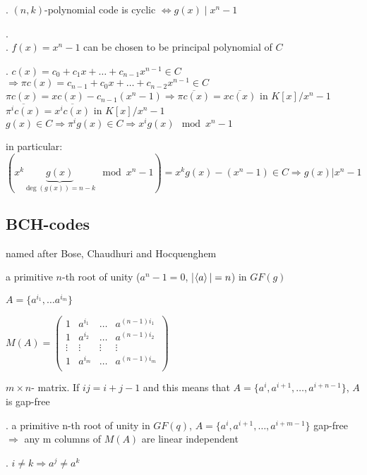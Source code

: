 \Theorem.
$(n,k)$-polynomial code is cyclic $\Leftrightarrow g(x) \mid x^n-1$

\Proof.\\
\ProofBackward.
$f(x) = x^n-1$ can be chosen to be principal polynomial of $C$

\ProofForward.
$c(x) = c_0 + c_1x + \ldots + c_{n-1}x^{n-1} \in C$\\
$\Rightarrow \pi c(x) = c_{n-1} + c_0x + \ldots + c_{n-2}x^{n-1} \in C$\\
$\pi c(x) = xc(x) - c_{n-1}(x^n-1) \Rightarrow \overline{\pi c(x)} = \overline{x c(x)}$ in $K[x]/x^n-1$\\
$\overline{\pi^i c(x)} = \overline{x^i c(x)}$ in $K[x]/x^n-1$\\

$g(x) \in C \Rightarrow \pi^i g(x) \in C \Rightarrow x^i g(x) \mod x^n -1$

in particular: $( x^k \underbrace{g(x)}_{\deg(g(x)) = n-k} \mod x^n -1 ) = x^k g(x) - (x^n-1) \in C \Rightarrow g(x)|x^n-1$

\subsection{BCH-codes }
named after Bose, Chaudhuri and Hocquenghem

a primitive $n$-th root of unity ($a^n-1=0$, |$\left\langle a \right\rangle|=n$) in $GF(g)$

$A = \{a^{i_1}, \ldots a^{i_m}\}$

$M(A) = \begin{pmatrix}
  1 & a^{i_1} & \ldots & a^{(n-1)i_1} \\
  1 & a^{i_2} & \ldots & a^{(n-1)i_2} \\
  \vdots  & \vdots & \vdots & \vdots \\
  1 & a^{i_m} & \ldots & a^{(n-1)i_m} \\
\end{pmatrix}$

$m\times n$- matrix. If $ij = i+j-1$ and this means that $A = \{a^i, a^{i+1}, \ldots, a^{i+n-1} \}$, $A$ is gap-free

\Theorem.
a primitive n-th root of unity in $GF(q)$, $A = \{a^i, a^{i+1}, \ldots, a^{i+m-1} \}$ gap-free\\
$\Rightarrow$ any m columns of $M(A)$ are linear independent

\Proof.
$i\neq k \Rightarrow a^j \neq a^k$

